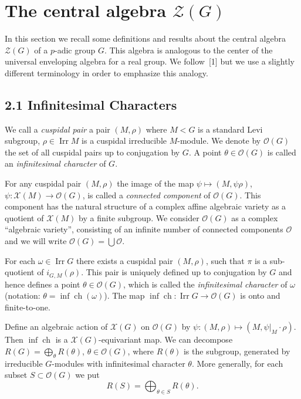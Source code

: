 \documentclass[12pt,a4paper]{article}
\theoremstyle{plain}
\theoremstyle{definition}
\theoremstyle{remark}
\DeclareMathOperator{\Irr}{Irr}
\DeclareMathOperator{\ch}{ch}
\newcommand{\cO}{\mathcal{O}}
\newcommand{\cZ}{\mathcal{Z}}
\newcommand{\cX}{\mathcal{X}}
\begin{document}
\section*{The central algebra $\cZ(G)$}
\addcontentsline{toc}{section}{The central algebra $\cZ(G)$}

In this section we recall some definitions and results about the central algebra $\cZ(G)$ of a $p$-adic group $G$. This algebra is analogous to the center of the universal enveloping algebra for a real group. We follow~[1] but we use a slightly different terminology in order to emphasize this analogy.

\subsection*{2.1 Infinitesimal Characters}

We call a \emph{cuspidal pair} a pair $(M, \rho)$ where $M < G$ is a standard Levi subgroup, $\rho \in \Irr M$ is a cuspidal irreducible $M$-module. We denote by $\cO(G)$ the set of all cuspidal pairs up to conjugation by $G$. A point $\theta \in \cO(G)$ is called an \emph{infinitesimal character} of $G$.

For any cuspidal pair $(M, \rho)$ the image of the map $\psi \mapsto (M, \psi\rho)$, $\psi: \cX(M) \to \cO(G)$, is called a \emph{connected component} of $\cO(G)$. This component has the natural structure of a complex affine algebraic variety as a quotient of $\cX(M)$ by a finite subgroup. We consider $\cO(G)$ as a complex ``algebraic variety'', consisting of an infinite number of connected components $\cO$ and we will write $\cO(G) = \bigcup \cO$.

For each $\omega \in \Irr G$ there exists a cuspidal pair $(M, \rho)$, such that $\pi$ is a sub-quotient of $i_{G,M}(\rho)$. This pair is uniquely defined up to conjugation by $G$ and hence defines a point $\theta \in \cO(G)$, which is called the \emph{infinitesimal character} of $\omega$ (notation: $\theta = \inf\ch(\omega)$). The map $\inf\ch: \Irr G \to \cO(G)$ is onto and finite-to-one.

Define an algebraic action of $\cX(G)$ on $\cO(G)$ by $\psi: (M, \rho) \mapsto (M, \psi|_M \cdot \rho)$. Then $\inf\ch$ is a $\cX(G)$-equivariant map. We can decompose $R(G) = \bigoplus_{\theta} R(\theta)$, $\theta \in \cO(G)$, where $R(\theta)$ is the subgroup, generated by irreducible $G$-modules with infinitesimal character $\theta$. More generally, for each subset $S \subset \cO(G)$ we put
\[
R(S) = \bigoplus_{\theta \in S} R(\theta).
\]
\end{document}
